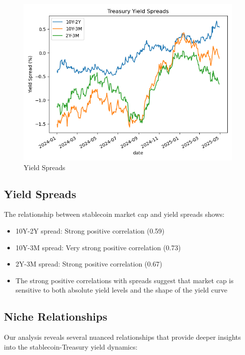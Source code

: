 \documentclass[12pt,a4paper]{article}
\begin{document}
\begin{figure}[H]
    \centering
    \includegraphics[width=\columnwidth]{figures/treasury_yield_spreads.png}
    \caption{Yield Spreads}
    \label{fig:spreads}
\end{figure}

\subsection{Yield Spreads}
The relationship between stablecoin market cap and yield spreads shows:
\begin{itemize}
    \item 10Y-2Y spread: Strong positive correlation (0.59)
    \item 10Y-3M spread: Very strong positive correlation (0.73)
    \item 2Y-3M spread: Strong positive correlation (0.67)
    \item The strong positive correlations with spreads suggest that market cap is sensitive to both absolute yield levels and the shape of the yield curve
\end{itemize}

\subsection{Niche Relationships}
Our analysis reveals several nuanced relationships that provide deeper insights into the stablecoin-Treasury yield dynamics:
\end{document}
